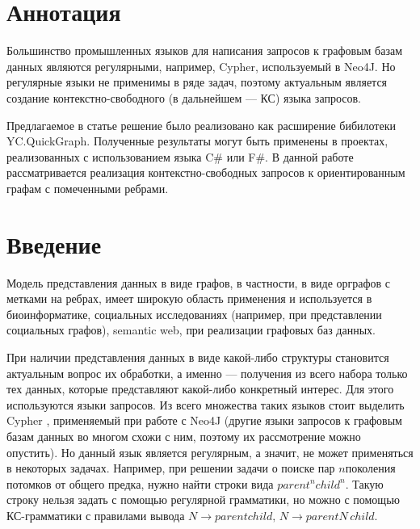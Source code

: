 \documentclass[14pt]{matmex-diploma-custom}
\begin{document}
\maketitle
\tableofcontents
\section*{Аннотация}
	Большинство промышленных языков для написания запросов к графовым базам данных являются регулярными, например, Cypher, используемый в Neo4J. Но регулярные языки не применимы в ряде задач, поэтому актуальным является создание контекстно-свободного (в дальнейшем --- КС) языка запросов.		

	Предлагаемое в статье решение было реализовано как расширение бибилотеки YC.QuickGraph. Полученные результаты могут быть применены в проектах, реализованных с использованием языка C\# или F\#. В данной работе рассматривается реализация контекстно-свободных запросов к ориентированным графам с помеченными ребрами.

\section*{Введение}
	Модель представления данных в виде графов, в частности, в виде орграфов с метками на ребрах, имеет широкую область применения и используется в биоинформатике, социальных исследованиях (например, при представлении социальных графов), semantic web, при реализации графовых баз данных. 
	
	При наличии представления данных в виде какой-либо структуры становится актуальным вопрос их обработки, а именно --- получения из всего набора только тех данных, которые представляют какой-либо конкретный интерес. Для этого используются языки запросов. Из всего множества таких языков стоит выделить Cypher \cite{Cypher}, применяемый при работе с Neo4J (другие языки запросов к графовым базам данных во многом схожи с ним, поэтому их рассмотрение можно опустить). Но данный язык является регулярным, а значит, не может применяться в некоторых задачах. Например, при решении задачи о поиске пар \(n\)поколения потомков от общего предка, нужно найти строки вида \(parent^nchild^n\). Такую строку нельзя задать с помощью регулярной грамматики, но можно с помощью КС-грамматики с правилами вывода \(N \to parent child, \,N \to parentN\, child\). 
	
\end{document}
